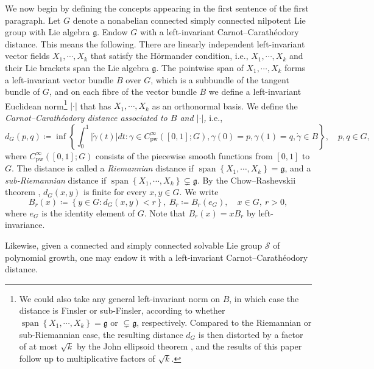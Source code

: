 \documentclass[11pt,reqno]{amsart}
\newcommand{\1}{\mathbf 1}
\begin{document}
We now begin by defining the concepts appearing in the first sentence of the first paragraph.
Let $G$ denote a nonabelian connected simply connected nilpotent Lie group with Lie algebra $\mathfrak{g}$. Endow $G$ with a left-invariant Carnot--Carath\'eodory distance. This means the following. There are linearly independent left-invariant vector fields $X_1,\cdots,X_k$ that satisfy the H\"ormander condition, i.e., $X_1,\cdots,X_k$ and their Lie brackets span the Lie algebra $\mathfrak{g}$. The pointwise span of $X_1,\cdots,X_k$ forms a left-invariant vector bundle $B$ over $G$, which is a subbundle of the tangent bundle of $G$, and on each fibre of the vector  bundle $B$ we define a left-invariant Euclidean norm\footnote{We could also take any general left-invariant norm on $B$, in which case the distance is Finsler or sub-Finsler, according to whether $\operatorname{span}\left\{X_1,\cdots,X_k\right\}=\mathfrak{g}$ or $\subsetneq \mathfrak{g}$, respectively. Compared to the Riemannian or sub-Riemannian case, the resulting distance $d_G$ is then distorted by a factor of at most $\sqrt{k}$ by the John ellipsoid theorem \cite{john1948extremum}, and the results of this paper follow up to multiplicative factors of  $\sqrt{k}$.} $\left|\cdot \right|$ that has $X_1,\cdots,X_k$ as an orthonormal basis. We define the \emph{Carnot--Carath\'eodory distance associated to $B$ and $\left|\cdot \right|$,} i.e.,
\[
d_G\left(p,q\right)\coloneqq \inf\left\{\int_0^1 \left|\dot{\gamma}\left(t\right) \right|dt : \gamma\in C_{\mathrm{pw}}^\infty \left(\left[0,1\right];G\right),\gamma\left(0\right)=p,\gamma\left(1\right)=q,\dot{\gamma}\in B \right\},\quad p,q\in G,
\]
where $C_{\mathrm{pw}}^\infty \left(\left[0,1\right];G\right)$ consists of the piecewise smooth functions from $\left[0,1\right]$ to $G$. The distance is called a \emph{Riemannian} distance if $\operatorname{span}\left\{X_1,\cdots,X_k\right\}=\mathfrak{g}$, and a \emph{sub-Riemannian} distance if $\operatorname{span}\left\{X_1,\cdots,X_k\right\}\subsetneq \mathfrak{g}$. By the Chow--Rashevskii theorem \cite{chow1940systeme,rashevskii1938connecting}, $d_G\left(x,y\right)$ is finite for every $x,y\in G$. We write
\[
B_r\left(x\right)\coloneqq \left\{y\in G:d_G\left(x,y\right)<r\right\},~B_r\coloneqq B_r\left(e_G\right),\quad x\in G,~r>0,
\]
where $e_G$ is the identity element of $G$. Note that $B_r\left(x\right)=xB_r$ by left-invariance. 


Likewise, given a connected and simply connected solvable Lie group $\mathcal{S}$ of polynomial growth, one may endow it with a left-invariant Carnot--Carath\'eodory distance.
\end{document}
